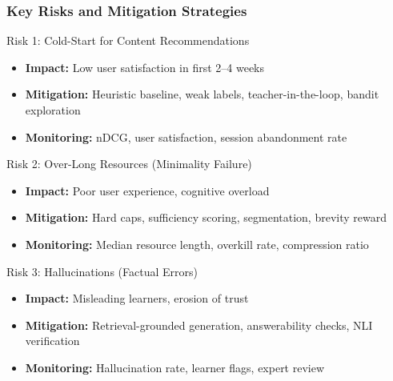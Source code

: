 \documentclass[aspectratio=169]{beamer}
\begin{document}
\begin{frame}
\frametitle{Key Risks and Mitigation Strategies}
\begin{block}{Risk 1: Cold-Start for Content Recommendations}
\begin{itemize}
\item \textbf{Impact:} Low user satisfaction in first 2--4 weeks
\item \textbf{Mitigation:} Heuristic baseline, weak labels, teacher-in-the-loop, bandit exploration
\item \textbf{Monitoring:} nDCG, user satisfaction, session abandonment rate
\end{itemize}
\end{block}

\begin{block}{Risk 2: Over-Long Resources (Minimality Failure)}
\begin{itemize}
\item \textbf{Impact:} Poor user experience, cognitive overload
\item \textbf{Mitigation:} Hard caps, sufficiency scoring, segmentation, brevity reward
\item \textbf{Monitoring:} Median resource length, overkill rate, compression ratio
\end{itemize}
\end{block}

\begin{block}{Risk 3: Hallucinations (Factual Errors)}
\begin{itemize}
\item \textbf{Impact:} Misleading learners, erosion of trust
\item \textbf{Mitigation:} Retrieval-grounded generation, answerability checks, NLI verification
\item \textbf{Monitoring:} Hallucination rate, learner flags, expert review
\end{itemize}
\end{block}
\end{frame}
\end{document}
